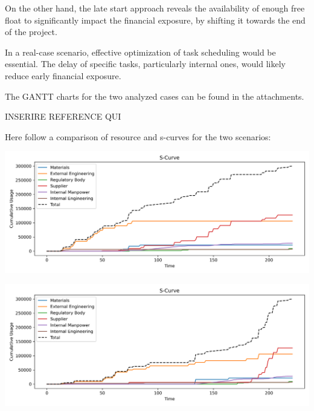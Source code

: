 \documentclass[12pt]{article}
\begin{document}
On the other hand, the late start approach reveals the availability of enough free float to significantly impact the financial exposure, by shifting it towards the end of the project.

In a real-case scenario, effective optimization of task scheduling would be essential. The delay of specific tasks, particularly internal ones, would likely reduce early financial exposure.

The GANTT charts for the two analyzed cases can be found in the attachments.

INSERIRE REFERENCE QUI

Here follow a comparison of resource and s-curves for the two scenarios:

\begin{minipage}{0.48\textwidth}
        \centering
        \includegraphics[width=\textwidth]{../s_curve_E.png}
        \label{fig:scurve_early}
\end{minipage}\hfill
\begin{minipage}{0.48\textwidth}
        \centering
        \includegraphics[width=\textwidth]{../s_curve_L.png}
        \label{fig:scurve_late}
\end{minipage}
\end{document}
